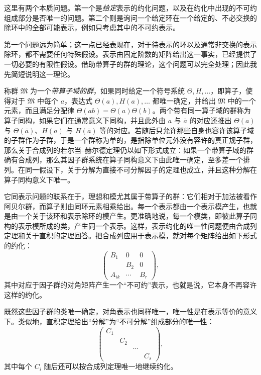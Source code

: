 这里有两个本质问题。第一个是\emph{给定}表示的约化问题，以及在约化中出现的不可约组成部分是否唯一的问题。第二个则是询问一个给定环在一个给定的、不必交换的除环中的全部可能表示，例如只考虑其中的不可约表示。

第一个问题远为简单；这一点已经表现在，对于待表示的环以及通常非交换的表示除环，都不需要任何特殊假设。表示由固定阶数的矩阵给出这一事实，已经提供了一切必要的有限性假设。借助带算子的群的理论，这个问题可以完全处理；因此我先简短说明这一理论。

称群 $\mathfrak{M}$ 为一个\emph{带算子域的群}，如果同时给定一个符号系统 $\Theta,H,\ldots$，即算子，使得对于 $\mathfrak{M}$ 中每个 $a$，表达式 $\Theta(a),H(a),\ldots$ 都唯一确定，并给出 $\mathfrak{M}$ 中的一个元素，而且满足分配律 $\Theta(ab)=\Theta(a)\Theta(b)$。两个带有同一算子域的群称为算子同构，如果它们在通常意义下同构，并且此外由 $a$ 与 $\bar a$ 的对应还推出 $\Theta(a)$ 与 $\Theta(\bar a)$、$H(a)$ 与 $H(\bar a)$ 等的对应。若随后只允许那些自身也容许该算子域的子群作为子群，于是一个群称为单的，是指除单位元外没有容许的真正规子群，那么关于合成列的若尔当--赫尔德定理仍以如下形式成立：如果一个带算子域的群确有合成列，那么其因子群系统在算子同构意义下由此唯一确定，至多差一个排列。在同一假设下，关于分解为直接不可分解因子的定理也成立，并且这种分解在算子同构意义下唯一。

它同表示问题的联系在于，理想和模尤其属于带算子的群：它们相对于加法被看作阿贝尔群，而算子则由同环元素相乘给出。每一个表示都由一个表示模产生，也就是由一个关于该环和表示除环的模产生。更准确地说，每一个模类，即彼此算子同构的表示模所成的类，产生同一个表示。这样，表示约化的唯一性问题便由合成列定理和关于直积的定理回答。把合成列应用于表示模，就对每个矩阵给出如下形式的约化：
\[
\begin{pmatrix}
B_1&0&0\\
&B_2&0\\
A_{ik}&\cdots&B_r
\end{pmatrix},
\]
其中对应于因子群的对角矩阵产生一个“不可约”表示，也就是说，它本身不再容许这样的约化。

既然这些因子群的类唯一确定，对角表示也同样唯一，唯一性是在表示等价的意义下。类似地，直积定理给出“分解”为“不可分解”组成部分的唯一性：
\[
\begin{pmatrix}
C_1&&&\\
&C_2&&\\
&&\cdots&\\
&&&C_s
\end{pmatrix},
\]
其中每个 $C_i$ 随后还可以按合成列定理唯一地继续约化。


